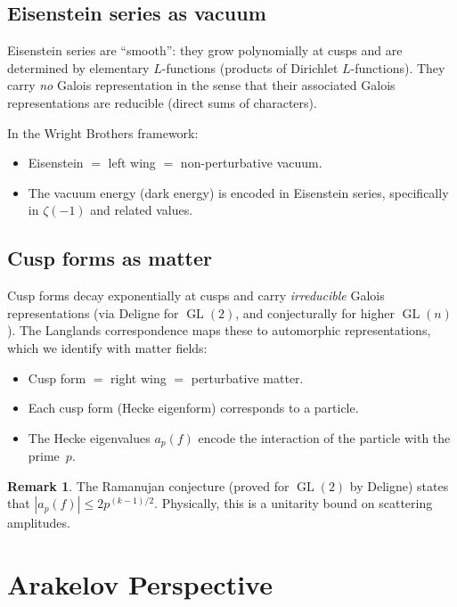 \documentclass[12pt,a4paper]{article}
\theoremstyle{definition}
\newtheorem{remark}[theorem]{Remark}
\newcommand{\GL}{\operatorname{GL}}
\begin{document}
\subsection{Eisenstein series as vacuum}

Eisenstein series are ``smooth'': they grow polynomially at cusps
and are determined by elementary $L$-functions (products of
Dirichlet $L$-functions).
They carry \emph{no} Galois representation in the sense that
their associated Galois representations are reducible
(direct sums of characters).

In the Wright Brothers framework:
\begin{itemize}
  \item Eisenstein $=$ left wing $=$ non-perturbative vacuum.
  \item The vacuum energy (dark energy) is encoded in
    Eisenstein series, specifically in $\zeta(-1)$ and
    related values.
\end{itemize}

\subsection{Cusp forms as matter}

Cusp forms decay exponentially at cusps and carry
\emph{irreducible} Galois representations (via Deligne for $\GL(2)$,
and conjecturally for higher $\GL(n)$).
The Langlands correspondence maps these to automorphic representations,
which we identify with matter fields:
\begin{itemize}
  \item Cusp form $=$ right wing $=$ perturbative matter.
  \item Each cusp form (Hecke eigenform) corresponds to a particle.
  \item The Hecke eigenvalues $a_p(f)$ encode the interaction
    of the particle with the prime~$p$.
\end{itemize}

\begin{remark}
The Ramanujan conjecture (proved for $\GL(2)$ by Deligne)
states that $|a_p(f)| \le 2p^{(k-1)/2}$.
Physically, this is a unitarity bound on scattering amplitudes.
\end{remark}

\section{Arakelov Perspective}\label{sec:arakelov}
\end{document}
